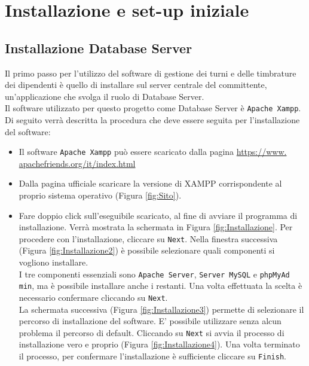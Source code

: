 \chapter{Installazione e set-up iniziale}
\section{Installazione Database Server}
Il primo passo per l'utilizzo del software di gestione dei turni e delle timbrature dei dipendenti è quello di installare sul server centrale del committente, un'applicazione che svolga il ruolo di Database Server.\\

\noindent
Il software utilizzato per questo progetto come Database Server è \verb|Apache Xampp|.\\
Di seguito verrà descritta la procedura che deve essere seguita per l'installazione del software:
\begin{itemize}
	\item Il software \verb|Apache Xampp| può essere scaricato dalla pagina \href{https://www.apachefriends.org/it/index.html}{https://www.\\apachefriends.org/it/index.html}
	\item Dalla pagina ufficiale scaricare la versione di XAMPP corrispondente al proprio sistema operativo (Figura \ref{fig:Sito}). 
	\item Fare doppio click sull'eseguibile scaricato, al fine di avviare il programma di installazione. Verrà mostrata la schermata in Figura \ref{fig:Installazione}.
		\noindent
		Per procedere con l'installazione, cliccare su \verb|Next|. Nella finestra successiva (Figura \ref{fig:Installazione2}) è possibile selezionare quali componenti si vogliono installare.\\
		I tre componenti essenziali sono \verb|Apache Server|, \verb|Server MySQL| e \verb|phpMyAd| \verb|min|, ma è possibile installare anche i restanti.
		\noindent
		Una volta effettuata la scelta è necessario confermare cliccando su \verb|Next|.\\
		La schermata successiva (Figura \ref{fig:Installazione3}) permette di selezionare il percorso di installazione del software. E' possibile utilizzare senza alcun problema il percorso di default.
		\noindent
		Cliccando su \verb|Next| si avvia il processo di installazione vero e proprio (Figura \ref{fig:Installazione4}). Una volta terminato il processo, per confermare l'installazione è sufficiente cliccare su \verb|Finish|.
\end{itemize}
